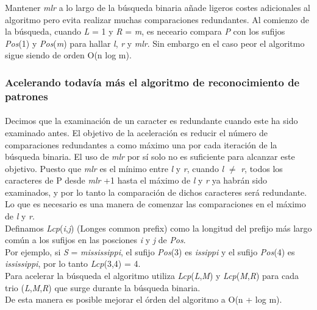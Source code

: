 \documentclass[es]{ifirak}
\begin{document}
Mantener \textit{mlr} a lo largo de la búsqueda binaria añade ligeros costes adicionales al algoritmo pero evita realizar muchas comparaciones redundantes. Al comienzo de la búsqueda, cuando \textit{L} = 1 y \textit{R} = \textit{m}, es neceario compara \textit{P} con los sufijos \textit{Pos}(1) y \textit{Pos}(\textit{m}) para hallar \textit{l}, \textit{r} y \textit{mlr}. Sin embargo en el caso peor el algoritmo sigue siendo de orden O(n log m).\\

\subsubsection{Acelerando todavía más el algoritmo de reconocimiento de patrones}
\paragraph{}
Decimos que la examinación de un caracter es redundante cuando este ha sido examinado antes. El objetivo de la aceleración es reducir el número de comparaciones redundantes a como máximo una por cada iteración de la búsqueda binaria. El uso de \textit{mlr} por sí solo no es suficiente para alcanzar este objetivo. Puesto que \textit{mlr} es el mínimo entre \textit{l} y \textit{r}, cuando \textit{l} $\neq$ \textit{r}, todos los caracteres de P desde \textit{mlr} +1 hasta el máximo de \textit{l} y \textit{r} ya habrán sido examinados, y por lo tanto la comparación de dichos caracteres será redundante. Lo que es necesario es una manera de comenzar las comparaciones en el máximo de \textit{l} y \textit{r}.\\

Definamos \textit{Lcp}(\textit{i},\textit{j}) (Longes common prefix) como la longitud del prefijo más largo común a los sufijos en las posciones \textit{i} y \textit{j} de \textit{Pos}. \\

Por ejemplo, si \textit{S} = \textit{mississippi}, el sufijo \textit{Pos}(3) es \textit{issippi} y el sufijo \textit{Pos}(4) es \textit{ississippi}, por lo tanto \textit{Lcp}(3,4) = 4.\\

Para acelerar la búsqueda el algoritmo utiliza \textit{Lcp}(\textit{L},\textit{M}) y \textit{Lcp}(\textit{M},\textit{R}) para cada trio (\textit{L},\textit{M},\textit{R}) que surge durante la búsqueda binaria.\\

De esta manera es posible mejorar el órden del algoritmo a O(n + log m).\\
\end{document}
